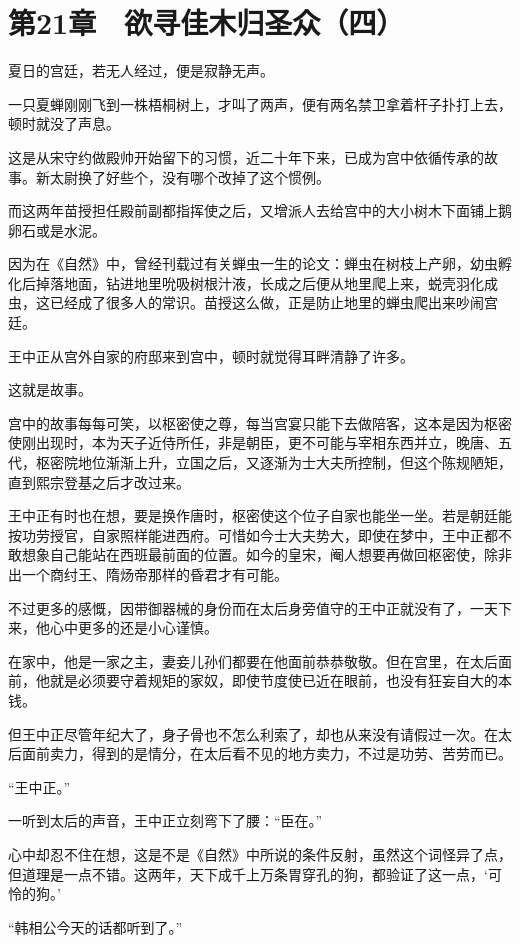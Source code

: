 \section{第21章　欲寻佳木归圣众（四）}

夏日的宫廷，若无人经过，便是寂静无声。

一只夏蝉刚刚飞到一株梧桐树上，才叫了两声，便有两名禁卫拿着杆子扑打上去，顿时就没了声息。

这是从宋守约做殿帅开始留下的习惯，近二十年下来，已成为宫中依循传承的故事。新太尉换了好些个，没有哪个改掉了这个惯例。

而这两年苗授担任殿前副都指挥使之后，又增派人去给宫中的大小树木下面铺上鹅卵石或是水泥。

因为在《自然》中，曾经刊载过有关蝉虫一生的论文：蝉虫在树枝上产卵，幼虫孵化后掉落地面，钻进地里吮吸树根汁液，长成之后便从地里爬上来，蜕壳羽化成虫，这已经成了很多人的常识。苗授这么做，正是防止地里的蝉虫爬出来吵闹宫廷。

王中正从宫外自家的府邸来到宫中，顿时就觉得耳畔清静了许多。

这就是故事。

宫中的故事每每可笑，以枢密使之尊，每当宫宴只能下去做陪客，这本是因为枢密使刚出现时，本为天子近侍所任，非是朝臣，更不可能与宰相东西并立，晚唐、五代，枢密院地位渐渐上升，立国之后，又逐渐为士大夫所控制，但这个陈规陋矩，直到熙宗登基之后才改过来。

王中正有时也在想，要是换作唐时，枢密使这个位子自家也能坐一坐。若是朝廷能按功劳授官，自家照样能进西府。可惜如今士大夫势大，即使在梦中，王中正都不敢想象自己能站在西班最前面的位置。如今的皇宋，阉人想要再做回枢密使，除非出一个商纣王、隋炀帝那样的昏君才有可能。

不过更多的感慨，因带御器械的身份而在太后身旁值守的王中正就没有了，一天下来，他心中更多的还是小心谨慎。

在家中，他是一家之主，妻妾儿孙们都要在他面前恭恭敬敬。但在宫里，在太后面前，他就是必须要守着规矩的家奴，即使节度使已近在眼前，也没有狂妄自大的本钱。

但王中正尽管年纪大了，身子骨也不怎么利索了，却也从来没有请假过一次。在太后面前卖力，得到的是情分，在太后看不见的地方卖力，不过是功劳、苦劳而已。

“王中正。”

一听到太后的声音，王中正立刻弯下了腰：“臣在。”

心中却忍不住在想，这是不是《自然》中所说的条件反射，虽然这个词怪异了点，但道理是一点不错。这两年，天下成千上万条胃穿孔的狗，都验证了这一点，‘可怜的狗。’

“韩相公今天的话都听到了。”

